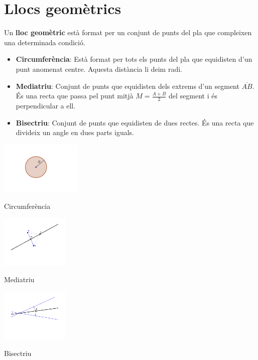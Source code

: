 \section{Llocs geomètrics}

\begin{theorybox}
	Un \textbf{lloc geomètric} està format per un conjunt de punts del pla que compleixen una determinada condició.
	
	\begin{itemize}	
		\item \textbf{Circumferència}: Està format per tots els punts del pla que equidisten d'un punt anomenat centre. Aquesta distància li deim radi.
		
		\item \textbf{Mediatriu}: Conjunt de punts que equidisten dels extrems d'un segment $\overline{AB}$. És una recta que passa pel punt mitjà $M=\frac{A+B}{2}$ del segment i és perpendicular a ell.
		
		\item \textbf{Bisectriu}: Conjunt de punts que equidisten de dues rectes. És una recta que divideix un angle en dues parts iguals.
\end{itemize} 
\end{theorybox}

\begin{theorybox}
		
		\begin{multicols}{3}
			\footnotesize
			\centering
			
			\includegraphics[height=2.5cm]{img-09/cercle}
			
			Circumferència
			
			\includegraphics[height=2.5cm]{img-09/mediatriu}
			
			Mediatriu
			
			\includegraphics[height=2.5cm]{img-09/bisectriu}
			
			Bisectriu
		\end{multicols}

\end{theorybox}

